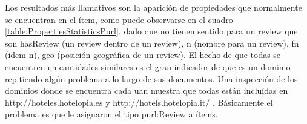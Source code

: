 Los resultados más llamativos son la aparición de propiedades que normalmente se encuentran en el ítem, como puede observarse en el cuadro \ref{table:PropertiesStatisticsPurl},
dado que no tienen sentido para un review que son hasReview (un review dentro de un review), n (nombre para un review), fn (idem n),
geo (posición geográfica de un review). El hecho de que todas se encuentren en cantidades similares es el gran indicador de que es 
un dominio repitiendo algún problema a lo largo de sus documentos. Una inspección de los dominios donde se encuentra cada uan muestra
que todas están incluídas en http://hoteles.hotelopia.es y http://hotels.hotelopia.it/ .
Básicamente el problema es que le asignaron el tipo purl:Review a ítems.
 




